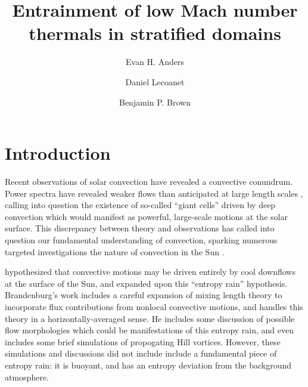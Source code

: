 \documentclass[twocolumn, amsmath, amsfonts, amssymb, trackchanges]{aastex62}
\begin{document}
\title{Entrainment of low Mach number thermals in stratified domains}


\author[0000-0002-3433-4733]{Evan H. Anders}
\author[0000-0002-7635-9728]{Daniel Lecoanet}
\author[0000-0001-8935-219X]{Benjamin P. Brown}


\begin{abstract}
\end{abstract}


\section{Introduction}
\label{sec:intro}
Recent observations of solar convection have revealed a convective conundrum.
Power spectra have revealed weaker flows than anticipated at large length scales
\citep{hanasoge&all2012, greer&all2015},
calling into question the existence of so-called ``giant cells'' driven by deep
convection which would manifest as powerful, large-scale motions at the solar
surface. This discrepancy between theory and observations has called into question
our fundamental understanding of convection, sparking numerous targeted investigations
the nature of convection in the Sun 
\citep{featherstone&hindman2016, omara&all2016, cossette&rast2016, kapyla&all2017,
hotta2017}.

\cite{spruit1997} hypothesized that convective motions may be driven entirely by
cool downflows at the surface of the Sun, and \citet{brandenburg2016} expanded
upon this ``entropy rain'' hypothesis. Brandenburg's work includes a careful
expansion of mixing length theory to incorporate flux contributions from nonlocal
convective motions, and handles this theory in a horizontally-averaged sense.
He includes some discussion of possible flow morphologies which could be manifestations
of this entropy rain, and even includes some brief simulations of propogating
Hill vortices. However, these simulations and discussions did not include 
include a fundamental piece of entropy rain: it is buoyant, and has an entropy
deviation from the background atmosphere.
\end{document}
